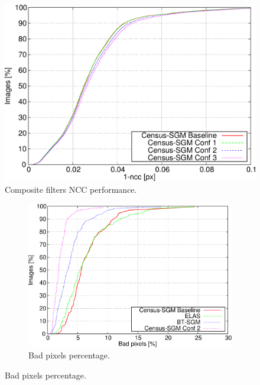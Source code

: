 \begin{figure}[p]
  \centering
  \includegraphics[width=\textwidth, height=0.4\textheight, trim=0 0 0 0,clip]{comp_ncc}
  \caption{ Composite filters NCC performance.}
  \label{fig:cp03_composite_NCC}
\end{figure}%

\begin{figure}[p]
  \centering
  \begin{subfigure}[h]{\textwidth}
    \centering
    \includegraphics[width=\textwidth, height=0.4\textheight, trim=0 0 0 0,clip]{algo_bpp_ee3}
    \caption{ Bad pixels percentage. }
    \label{fig:cp03_algorithms_LGT_bpp}
  \end{subfigure}%
\end{figure}

